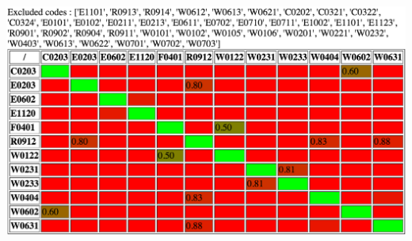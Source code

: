 \documentclass[12pt, a4paper]{article}
\begin{document}
\includegraphics[angle=90,origin=c,totalheight=\textheight]{cap3}
\end{document}
